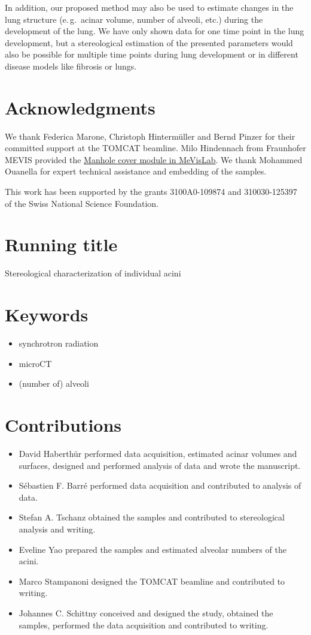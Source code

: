 \documentclass[paper=a4,twocolumn=true,DIV=calc,abstract,english]{scrartcl}
\newcommand{\eg}{e.\,g.\ }
\begin{document}
In addition, our proposed method may also be used to estimate changes in the lung structure (\eg acinar volume, number of alveoli, etc.) during the development of the lung.
We have only shown data for one time point in the lung development, but a stereological estimation of the presented parameters would also be possible for multiple time points during lung development or in different disease models like fibrosis or  lungs.

\section{Acknowledgments}
We thank Federica Marone, Christoph Hintermüller and Bernd Pinzer for their committed support at the TOMCAT beamline.
Milo Hindennach from Fraunhofer MEVIS provided the \href{http://www.mevis-research.de/cgi-bin/discus/board-auth.cgi?lm=1282233250&file=/839/11760.html}{Manhole cover module in MeVisLab}.
We thank Mohammed Ouanella for expert technical assistance and embedding of the samples.

This work has been supported by the grants 3100A0-109874 and 310030-125397 of the Swiss National Science Foundation.

\clearpage
\onecolumn

\section*{Running title}
Stereological characterization of individual acini

\section*{Keywords}
\begin{itemize}
	\item synchrotron radiation 
	\item microCT
	\item (number of) alveoli
\end{itemize}

\section*{Contributions}
\begin{itemize}
	\item David Haberthür performed data acquisition, estimated acinar volumes and surfaces, designed and performed analysis of data and wrote the manuscript.
	\item Sébastien F. Barré performed data acquisition and contributed to analysis of data.
	\item Stefan A. Tschanz obtained the samples and contributed to stereological analysis and writing.
	\item Eveline Yao prepared the samples and estimated alveolar numbers of the acini.
	\item Marco Stampanoni designed the TOMCAT beamline and contributed to writing.
	\item Johannes C. Schittny conceived and designed the study, obtained the samples, performed the data acquisition and contributed to writing.
\end{itemize}
\end{document}
